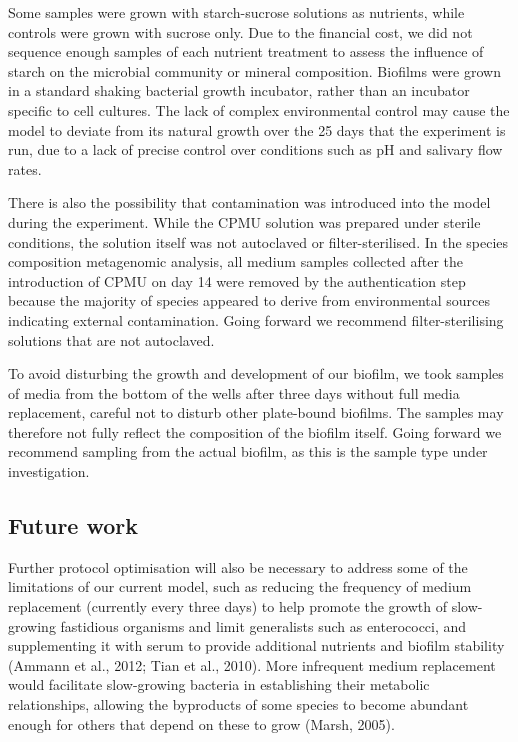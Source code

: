\documentclass[
]{article}
\begin{document}
Some samples were grown with starch-sucrose solutions as nutrients,
while controls were grown with sucrose only. Due to the financial cost,
we did not sequence enough samples of each nutrient treatment to assess
the influence of starch on the microbial community or mineral
composition. Biofilms were grown in a standard shaking bacterial growth
incubator, rather than an incubator specific to cell cultures. The lack
of complex environmental control may cause the model to deviate from its
natural growth over the 25 days that the experiment is run, due to a
lack of precise control over conditions such as pH and salivary flow
rates.

There is also the possibility that contamination was introduced into the
model during the experiment. While the CPMU solution was prepared under
sterile conditions, the solution itself was not autoclaved or
filter-sterilised. In the species composition metagenomic analysis, all
medium samples collected after the introduction of CPMU on day 14 were
removed by the authentication step because the majority of species
appeared to derive from environmental sources indicating external
contamination. Going forward we recommend filter-sterilising solutions
that are not autoclaved.

To avoid disturbing the growth and development of our biofilm, we took
samples of media from the bottom of the wells after three days without
full media replacement, careful not to disturb other plate-bound
biofilms. The samples may therefore not fully reflect the composition of
the biofilm itself. Going forward we recommend sampling from the actual
biofilm, as this is the sample type under investigation.

\hypertarget{future-work}{%
\subsection{Future work}\label{future-work}}

Further protocol optimisation will also be necessary to address some of
the limitations of our current model, such as reducing the frequency of
medium replacement (currently every three days) to help promote the
growth of slow-growing fastidious organisms and limit generalists such
as enterococci, and supplementing it with serum to provide additional
nutrients and biofilm stability (Ammann et al., 2012; Tian et al.,
2010). More infrequent medium replacement would facilitate slow-growing
bacteria in establishing their metabolic relationships, allowing the
byproducts of some species to become abundant enough for others that
depend on these to grow (Marsh, 2005).
\end{document}
